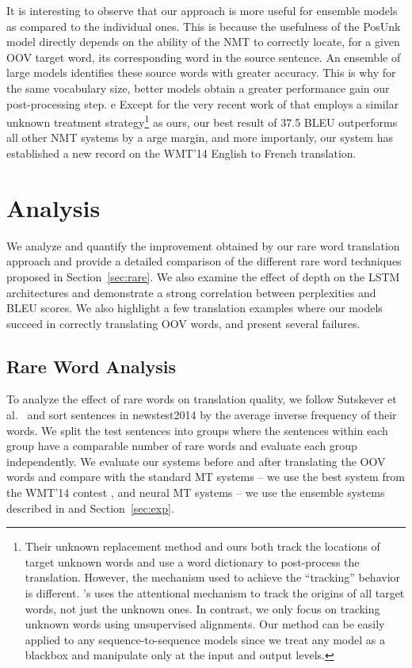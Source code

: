 \documentclass[11pt]{article}
\newcommand{\bestbleuunk}{37.5} \newcommand{\bestbleuunkwmt}{36.6} \newcommand{\bestunkimp}{2.8} \newcommand{\unkimp}{1.9} \newcommand{\unkimpilya}{2.7} \newcommand{\imprare}{4.8}
\begin{document}
It is interesting to observe that our approach is more useful for ensemble models as compared to the individual ones. 
This is because the usefulness of the PosUnk model directly
depends on the ability of the NMT to correctly locate, for a given OOV target word, its corresponding word in the source sentence.  An ensemble of large models identifies these source words with greater accuracy.  This is why for the same vocabulary size, better models obtain a greater performance gain our post-processing step. 
e
Except for the very recent work of  that employs a similar unknown treatment strategy\footnote{Their unknown replacement method and ours both track the locations of target unknown words and use a word dictionary to post-process the translation. However, the mechanism used to achieve the ``tracking'' behavior is different. 's uses the attentional mechanism to track the origins of all target words, not just the unknown ones. In contrast, we only focus on tracking unknown words using unsupervised alignments. Our method can be easily applied to any sequence-to-sequence models since we treat any model as a blackbox and manipulate only at the input and output levels.} as ours, our best result of \bestbleuunk{} BLEU outperforms all other NMT systems by a 
arge margin, and 
more importanly, our system has established a new record on the WMT'14 English to French translation.

 
\section{Analysis}
\label{sec:analysis}

We analyze and quantify the improvement obtained by our rare word translation approach and provide a detailed 
comparison of the different rare word techniques proposed in Section~\ref{sec:rare}. We also examine the effect of 
depth on the LSTM architectures and demonstrate a strong correlation between perplexities and BLEU scores. We also highlight 
a few translation examples where our models succeed in correctly translating OOV words, and present 
several failures.

\subsection{Rare Word Analysis}
To analyze the effect of rare words on translation quality, 
we follow Sutskever et al.~\cite{sutskever14} and sort sentences in 
newstest2014 by the average inverse frequency of their words. 
We split the test sentences into groups where the sentences within each group have a comparable number of rare words
 and evaluate each group independently. We evaluate our 
systems before and after translating the OOV words and compare with 
the standard MT systems -- we use the best system from the WMT'14 contest \cite{durrani-EtAl:2014:W14-33},
and neural MT systems -- we use the ensemble systems described in \cite{sutskever14} and Section~\ref{sec:exp}.
\end{document}
